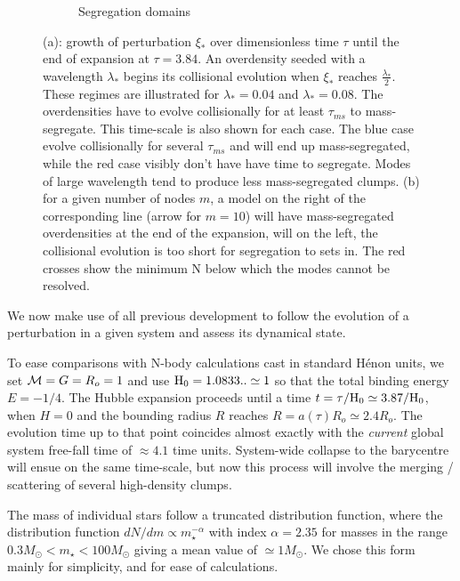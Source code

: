 \begin{figure}
\begin{subfigure}[b]{0.49\textwidth}
        \caption{Segregation domains}
        \label{Fig:1_segregation_zone}
    \end{subfigure}
\caption{(a): growth of perturbation $\xi_*$ over dimensionless time $\tau$ until the end of expansion at $\tau = 3.84$. An overdensity seeded with a wavelength $\lambda_*$ begins its collisional evolution when $\xi_*$ reaches $\frac{\lambda_*}{2}$. These regimes are illustrated for $\lambda_* =0.04$ and  $\lambda_* =0.08$. The overdensities have to evolve collisionally for at least $\tau_{ms}$ to mass-segregate. This time-scale is also shown for each case. The blue case evolve collisionally for several $\tau_{ms}$ and will end up mass-segregated, while the red case visibly don't have have time to segregate. Modes of large wavelength tend to produce less mass-segregated clumps. (b) for a given number of nodes $m$, a model on the right of the corresponding line (arrow for $m=10$) will have mass-segregated overdensities at the end of the expansion, will on the left, the collisional evolution is too short for segregation to sets in. The red crosses show the minimum N below which the modes cannot be resolved.} 
\label{Fig:0_perturbation_growth}
\end{figure}


We now make use of all previous development to follow the evolution of a perturbation in a given system and assess its dynamical state.

To ease comparisons with N-body calculations cast in standard H\'enon units, we set ${\cal M} = G = R_o = 1 $ and use ${\textrm{H}}_0 = 1.0833 .. \simeq 1$ so that the total binding energy $E = -1/4$. The Hubble expansion proceeds until a time $t = \tau / {\textrm{H}}_0 \simeq 3.87 / {\textrm{H}}_0$, when $H = 0$ and the bounding radius $R$ reaches $R = a(\tau)R_o \simeq 2.4 R_o$. The evolution time up to that point coincides almost exactly with the {\it current} global system free-fall time of $\approx 4.1$ time units. System-wide collapse to the barycentre will ensue on the same time-scale, but now this process will involve the merging / scattering of several high-density clumps. 

The mass of individual stars follow a  truncated \cite{Salpeter1955} distribution function, where the distribution function $ dN/dm \propto m_\star^{-\alpha}$ with index $\alpha = 2.35$ for masses in the range  $0.3 M_\odot < m_\star < 100 M_\odot$ giving a mean value of $\simeq 1 M_\odot$. We chose this form mainly for simplicity, and for ease of calculations. 


